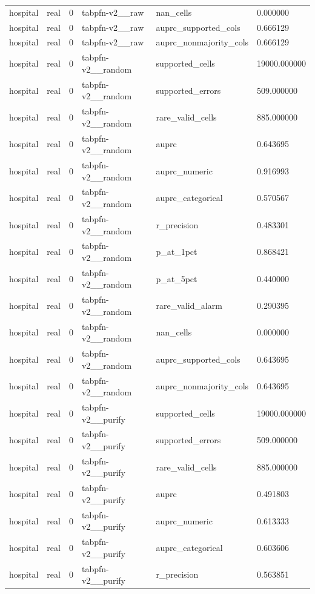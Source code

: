 \begin{tabular}{llllll}
hospital & real & 0 & tabpfn-v2\_\_raw & nan\_cells & 0.000000 \\
hospital & real & 0 & tabpfn-v2\_\_raw & auprc\_supported\_cols & 0.666129 \\
hospital & real & 0 & tabpfn-v2\_\_raw & auprc\_nonmajority\_cols & 0.666129 \\
hospital & real & 0 & tabpfn-v2\_\_random & supported\_cells & 19000.000000 \\
hospital & real & 0 & tabpfn-v2\_\_random & supported\_errors & 509.000000 \\
hospital & real & 0 & tabpfn-v2\_\_random & rare\_valid\_cells & 885.000000 \\
hospital & real & 0 & tabpfn-v2\_\_random & auprc & 0.643695 \\
hospital & real & 0 & tabpfn-v2\_\_random & auprc\_numeric & 0.916993 \\
hospital & real & 0 & tabpfn-v2\_\_random & auprc\_categorical & 0.570567 \\
hospital & real & 0 & tabpfn-v2\_\_random & r\_precision & 0.483301 \\
hospital & real & 0 & tabpfn-v2\_\_random & p\_at\_1pct & 0.868421 \\
hospital & real & 0 & tabpfn-v2\_\_random & p\_at\_5pct & 0.440000 \\
hospital & real & 0 & tabpfn-v2\_\_random & rare\_valid\_alarm & 0.290395 \\
hospital & real & 0 & tabpfn-v2\_\_random & nan\_cells & 0.000000 \\
hospital & real & 0 & tabpfn-v2\_\_random & auprc\_supported\_cols & 0.643695 \\
hospital & real & 0 & tabpfn-v2\_\_random & auprc\_nonmajority\_cols & 0.643695 \\
hospital & real & 0 & tabpfn-v2\_\_purify & supported\_cells & 19000.000000 \\
hospital & real & 0 & tabpfn-v2\_\_purify & supported\_errors & 509.000000 \\
hospital & real & 0 & tabpfn-v2\_\_purify & rare\_valid\_cells & 885.000000 \\
hospital & real & 0 & tabpfn-v2\_\_purify & auprc & 0.491803 \\
hospital & real & 0 & tabpfn-v2\_\_purify & auprc\_numeric & 0.613333 \\
hospital & real & 0 & tabpfn-v2\_\_purify & auprc\_categorical & 0.603606 \\
hospital & real & 0 & tabpfn-v2\_\_purify & r\_precision & 0.563851 \\

\end{tabular}
